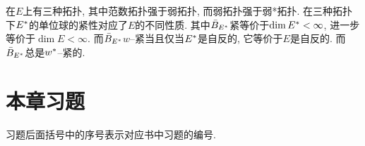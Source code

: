     \begin{Remark}
    在$ E $上有三种拓扑, 其中范数拓扑强于弱拓扑, 而弱拓扑强于弱*拓扑. 在三种拓扑下$ E^{*} $的单位球的紧性对应了$ E $的不同性质. 其中$ \bar{B}_{E^{*}} $紧等价于$ \dim E^{*}<\infty $, 进一步等价于$ \dim E<\infty $. 而$ \bar{B}_{E^{*}} $$ w $--紧当且仅当$ E^{*} $是自反的, 它等价于$ E $是自反的. 而$ \bar{B}_{E^{*}} $总是$ w^{*} $--紧的.
    \end{Remark}

\section*{本章习题}

    习题后面括号中的序号表示对应书中习题的编号.

